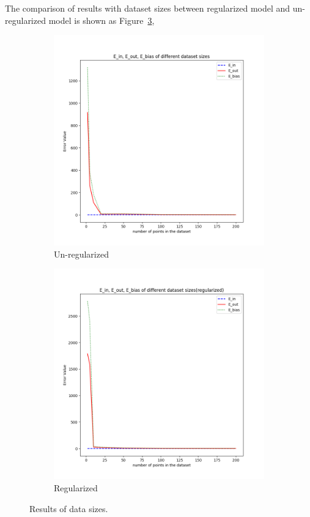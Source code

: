 \documentclass[12pt,letterpaper]{article}
\begin{document}
The comparison of results with dataset sizes between regularized model and un-regularized model is shown as Figure~\ref{fig:datasize_reg},
\begin{figure}[h]
\centering
\begin{subfigure}{.45\textwidth}
  \centering
  \includegraphics[width=.9\linewidth]{test_N_noreg.png}
  \caption{\small Un-regularized}
  \label{fig:sub1}
\end{subfigure}
\begin{subfigure}{.45\textwidth}
  \centering
  \includegraphics[width=.9\linewidth]{test_N_regularized.png}
  \caption{\small Regularized}
  \label{fig:sub2}
\end{subfigure}
\caption{\small Results of data sizes.}
\label{fig:datasize_reg}
\end{figure}
\end{document}
